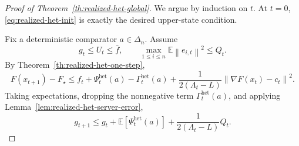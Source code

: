 \documentclass[10pt,a4paper]{amsart}
\newcommand{\EE}{\mathbb E}
\newcommand{\norm}[1]{\left\lVert #1\right\rVert}
\begin{document}
\begin{proof}[Proof of Theorem~\ref{th:realized-het-global}]
We argue by induction on $t$. At $t=0$, \eqref{eq:realized-het-init} is exactly the desired upper-state
condition.

Fix a deterministic comparator $a\in\Delta_n$. Assume
\[
g_t\le U_t\le \bar f,
\qquad
\max_{1\le i\le n}\EE\norm{e_{i,t}}^2\le Q_t.
\]
By Theorem~\ref{th:realized-het-one-step},
\[
F(x_{t+1})-F_\star
\le
f_t+\Psi_t^{\mathrm{het}}(a)-\Gamma_t^{\mathrm{het}}(a)
+\frac{1}{2(\Lambda_t-L)}\norm{\nabla F(x_t)-c_t}^2.
\]
Taking expectations, dropping the nonnegative term $\Gamma_t^{\mathrm{het}}(a)$, and applying
Lemma~\ref{lem:realized-het-server-error},
\begin{equation}
g_{t+1}
\le
g_t+\EE[\Psi_t^{\mathrm{het}}(a)]
+\frac{1}{2(\Lambda_t-L)}Q_t.
\label{eq:realized-het-global-start}\end{equation}


\end{proof}
\end{document}
